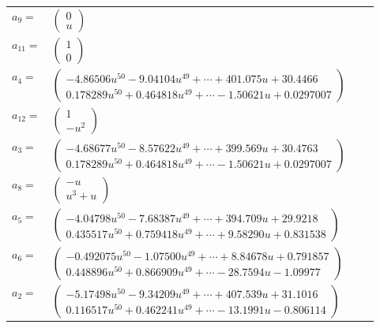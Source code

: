 \documentclass[1p]{elsarticle_modified}
\theoremstyle{definition}
\begin{document}
\begin{tabular}{m{7pt} m{180pt} m{7pt} m{180pt} }
\flushright $a_{9}=$&$\begin{pmatrix}0\\u\end{pmatrix}$ \\
\flushright $a_{11}=$&$\begin{pmatrix}1\\0\end{pmatrix}$ \\
\flushright $a_{4}=$&$\begin{pmatrix}-4.86506 u^{50}-9.04104 u^{49}+\cdots+401.075 u+30.4466\\0.178289 u^{50}+0.464818 u^{49}+\cdots-1.50621 u+0.0297007\end{pmatrix}$ \\
\flushright $a_{12}=$&$\begin{pmatrix}1\\- u^2\end{pmatrix}$ \\
\flushright $a_{3}=$&$\begin{pmatrix}-4.68677 u^{50}-8.57622 u^{49}+\cdots+399.569 u+30.4763\\0.178289 u^{50}+0.464818 u^{49}+\cdots-1.50621 u+0.0297007\end{pmatrix}$ \\
\flushright $a_{8}=$&$\begin{pmatrix}- u\\u^3+u\end{pmatrix}$ \\
\flushright $a_{5}=$&$\begin{pmatrix}-4.04798 u^{50}-7.68387 u^{49}+\cdots+394.709 u+29.9218\\0.435517 u^{50}+0.759418 u^{49}+\cdots+9.58290 u+0.831538\end{pmatrix}$ \\
\flushright $a_{6}=$&$\begin{pmatrix}-0.492075 u^{50}-1.07500 u^{49}+\cdots+8.84678 u+0.791857\\0.448896 u^{50}+0.866909 u^{49}+\cdots-28.7594 u-1.09977\end{pmatrix}$ \\
\flushright $a_{2}=$&$\begin{pmatrix}-5.17498 u^{50}-9.34209 u^{49}+\cdots+407.539 u+31.1016\\0.116517 u^{50}+0.462241 u^{49}+\cdots-13.1991 u-0.806114\end{pmatrix}$ \\

\end{tabular}
\end{document}
